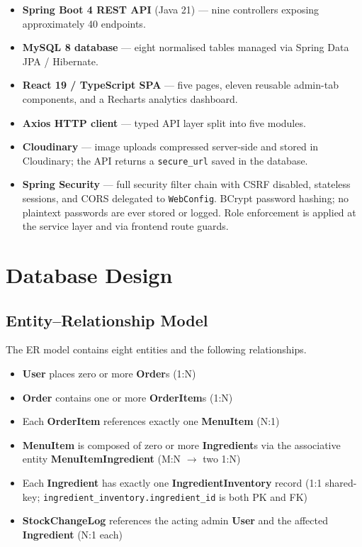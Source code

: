 \documentclass[12pt,a4paper]{article}
\begin{document}
\begin{itemize}
    \item \textbf{Spring Boot 4 REST API} (Java 21) --- nine controllers
          exposing approximately 40 endpoints.
    \item \textbf{MySQL 8 database} --- eight normalised tables managed via
          Spring Data JPA / Hibernate.
    \item \textbf{React 19 / TypeScript SPA} --- five pages, eleven reusable
          admin-tab components, and a Recharts analytics dashboard.
    \item \textbf{Axios HTTP client} --- typed API layer split into five modules.
    \item \textbf{Cloudinary} --- image uploads compressed server-side and stored
          in Cloudinary; the API returns a \texttt{secure\_url} saved in the
          database.
    \item \textbf{Spring Security} --- full security filter chain with CSRF
          disabled, stateless sessions, and CORS delegated to \texttt{WebConfig}.
          BCrypt password hashing; no plaintext passwords are ever stored or
          logged. Role enforcement is applied at the service layer and via
          frontend route guards.
\end{itemize}

\section{Database Design}

\subsection{Entity--Relationship Model}

The ER model contains eight entities and the following relationships.

\begin{itemize}
    \item \textbf{User} places zero or more \textbf{Order}s \hfill(1:N)
    \item \textbf{Order} contains one or more \textbf{OrderItem}s \hfill(1:N)
    \item Each \textbf{OrderItem} references exactly one \textbf{MenuItem} \hfill(N:1)
    \item \textbf{MenuItem} is composed of zero or more \textbf{Ingredient}s via
          the associative entity \textbf{MenuItemIngredient} \hfill(M:N $\to$ two 1:N)
    \item Each \textbf{Ingredient} has exactly one \textbf{IngredientInventory}
          record (1:1 shared-key; \texttt{ingredient\_inventory.ingredient\_id}
          is both PK and FK)
    \item \textbf{StockChangeLog} references the acting admin \textbf{User} and
          the affected \textbf{Ingredient} \hfill(N:1 each)
\end{itemize}
\end{document}
